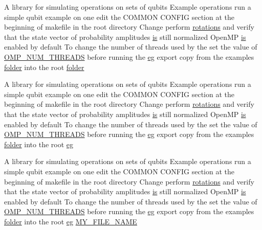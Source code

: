 \begin{DoxyCompactItemize}
\item 
A library for simulating operations on sets of qubits Example operations run a simple qubit example on one edit the COMMON CONFIG section at the beginning of makefile in the root directory Change perform \hyperlink{README_8md_aa51a655a099aacfa420285f13958dee7}{rotations} and verify that the state vector of probability amplitudes \hyperlink{README_8md_a2a622829425af2df994a6f7c6deb0c91}{is} still normalized OpenMP \hyperlink{README_8md_a2a622829425af2df994a6f7c6deb0c91}{is} enabled by default To change the number of threads used by the set the value of \hyperlink{README_8md_a79266f70cc0ecc5861ae53ebd180bf65}{OMP\_\-NUM\_\-THREADS} before running the \hyperlink{README_8md_accf5ef1dd79776855485925f622a4f09}{eg} export copy from the examples \hyperlink{README_8md_ac7a6c2e0f131857c641dc6c0bc4a395a}{folder} into the root \hyperlink{README_8md_ac7a6c2e0f131857c641dc6c0bc4a395a}{folder}
\item 
A library for simulating operations on sets of qubits Example operations run a simple qubit example on one edit the COMMON CONFIG section at the beginning of makefile in the root directory Change perform \hyperlink{README_8md_aa51a655a099aacfa420285f13958dee7}{rotations} and verify that the state vector of probability amplitudes \hyperlink{README_8md_a2a622829425af2df994a6f7c6deb0c91}{is} still normalized OpenMP \hyperlink{README_8md_a2a622829425af2df994a6f7c6deb0c91}{is} enabled by default To change the number of threads used by the set the value of \hyperlink{README_8md_a79266f70cc0ecc5861ae53ebd180bf65}{OMP\_\-NUM\_\-THREADS} before running the \hyperlink{README_8md_accf5ef1dd79776855485925f622a4f09}{eg} export copy from the examples \hyperlink{README_8md_ac7a6c2e0f131857c641dc6c0bc4a395a}{folder} into the root \hyperlink{README_8md_accf5ef1dd79776855485925f622a4f09}{eg}
\item 
A library for simulating operations on sets of qubits Example operations run a simple qubit example on one edit the COMMON CONFIG section at the beginning of makefile in the root directory Change perform \hyperlink{README_8md_aa51a655a099aacfa420285f13958dee7}{rotations} and verify that the state vector of probability amplitudes \hyperlink{README_8md_a2a622829425af2df994a6f7c6deb0c91}{is} still normalized OpenMP \hyperlink{README_8md_a2a622829425af2df994a6f7c6deb0c91}{is} enabled by default To change the number of threads used by the set the value of \hyperlink{README_8md_a79266f70cc0ecc5861ae53ebd180bf65}{OMP\_\-NUM\_\-THREADS} before running the \hyperlink{README_8md_accf5ef1dd79776855485925f622a4f09}{eg} export copy from the examples \hyperlink{README_8md_ac7a6c2e0f131857c641dc6c0bc4a395a}{folder} into the root \hyperlink{README_8md_accf5ef1dd79776855485925f622a4f09}{eg} \hyperlink{README_8md_a6c38bfee9462d167a5dd9e634940a8ba}{MY\_\-FILE\_\-NAME}

\end{DoxyCompactItemize}
